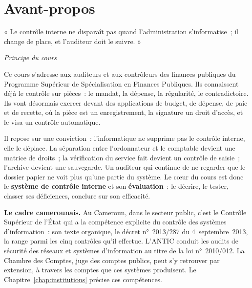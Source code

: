 
\chapter*{Avant-propos}

\epigraph{« Le contrôle interne ne disparaît pas quand l'administration
s'informatise~; il change de place, et l'auditeur doit le suivre. »}%
{\textit{Principe du cours}}

Ce cours s'adresse aux auditeurs et aux contrôleurs des finances publiques
du Programme Supérieur de Spécialisation en Finances Publiques. Ils
connaissent déjà le contrôle sur pièces~: le mandat, la dépense, la
régularité, le contradictoire. Ils vont désormais exercer devant des
applications de budget, de dépense, de paie et de recette, où la pièce est
un enregistrement, la signature un droit d'accès, et le visa un contrôle
automatique.

Il repose sur une conviction~: l'informatique ne supprime pas le contrôle
interne, elle le déplace. La séparation entre l'ordonnateur et le comptable
devient une matrice de droits~; la vérification du service fait devient un
contrôle de saisie~; l'archive devient une sauvegarde. Un auditeur qui
continue de ne regarder que le dossier papier ne voit plus qu'une partie du
système. Le cœur du cours est donc le \textbf{système de contrôle interne}
et son \textbf{évaluation}~: le décrire, le tester, classer ses
déficiences, conclure sur son efficacité.

\bigskip

\textbf{Le cadre camerounais.} Au Cameroun, dans le secteur public, c'est
le Contrôle Supérieur de l'État qui a la compétence explicite du contrôle
des systèmes d'information~: son texte organique, le décret n°~2013/287
du 4~septembre~2013, la range parmi les cinq contrôles qu'il effectue.
L'ANTIC conduit les audits de sécurité des réseaux et systèmes
d'information au titre de la loi n°~2010/012. La Chambre des Comptes, juge
des comptes publics, peut s'y retrouver par extension, à travers les
comptes que ces systèmes produisent. Le Chapitre~\ref{chap:institutions}
précise ces compétences.

